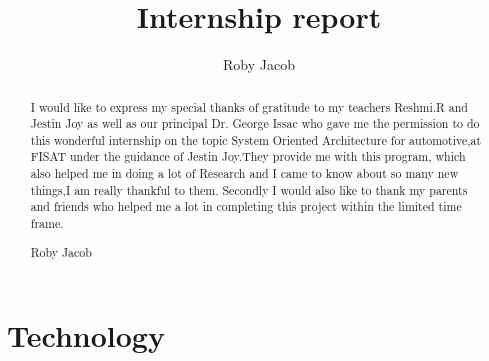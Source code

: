 \documentclass{fisattraining}
\title{Internship report}
\author{Roby Jacob}
\begin{document}
\maketitle
\makecert

\newpage
{}
\setcounter{page}{1}
\thispagestyle{plain}
\newpage
\renewcommand\abstractname{ACKNOWLEDGMENT}
\thispagestyle{plain}
\begin{abstract}
\vspace{5cm}
I would like to express my special thanks of gratitude to my teachers
Reshmi.R and Jestin Joy as well as our principal Dr. George Issac who gave
me the permission to do this wonderful internship on the topic System Oriented Architecture
for automotive,at FISAT under the guidance of Jestin Joy.They provide me with this program, which also helped me in doing a lot of Research and I came to know about so many new things,I am really thankful to them. Secondly
I would also like to thank my parents and friends who helped me a lot in
completing this project within the limited time frame.
\vspace{1cm}
\begin{flushright}
Roby Jacob
\end{flushright}
\end{abstract}
\newpage

\restoregeometry
\tableofcontents
\newpage

\cleardoublepage
{}
\listoffigures
\newpage

\chapter{Technology}
\setcounter{page}{1}
\renewcommand{\baselinestretch}{1.50}
\end{document}
